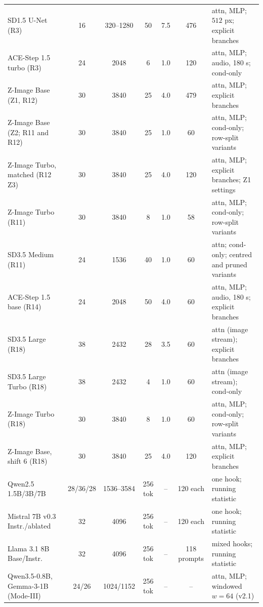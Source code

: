 \documentclass[11pt]{article}
\begin{document}
\begin{table}[!t]
\begin{tabularx}{\linewidth}{@{}>{\raggedright\arraybackslash}p{3.5cm}@{\hspace{4pt}}ccc@{\hspace{4pt}}c@{\hspace{4pt}}c@{\hspace{4pt}}L@{}}
SD1.5 U-Net (R3) & 16 & 320--1280 & 50 & 7.5 & 476 & attn, MLP; $512$ px; explicit branches\\
ACE-Step 1.5 turbo (R3) & 24 & 2048 & 6 & 1.0 & 120 & attn, MLP; audio, 180 s; cond-only\\
\midrule
Z-Image Base (Z1, R12) & 30 & 3840 & 25 & 4.0 & 479 & attn, MLP; explicit branches\\
Z-Image Base (Z2; R11 and R12) & 30 & 3840 & 25 & 1.0 & 60 & attn, MLP; cond-only; row-split variants\\
Z-Image Turbo, matched (R12 Z3) & 30 & 3840 & 25 & 4.0 & 120 & attn, MLP; explicit branches; Z1 settings\\
Z-Image Turbo (R11) & 30 & 3840 & 8 & 1.0 & 58 & attn, MLP; cond-only; row-split variants\\
SD3.5 Medium (R11) & 24 & 1536 & 40 & 1.0 & 60 & attn; cond-only; centred and pruned variants\\
ACE-Step 1.5 base (R14) & 24 & 2048 & 50 & 4.0 & 60 & attn, MLP; audio, 180 s; explicit branches\\
SD3.5 Large (R18) & 38 & 2432 & 28 & 3.5 & 60 & attn (image stream); explicit branches\\
SD3.5 Large Turbo (R18) & 38 & 2432 & 4 & 1.0 & 60 & attn (image stream); cond-only\\
Z-Image Turbo (R18) & 30 & 3840 & 8 & 1.0 & 60 & attn, MLP; cond-only; row-split variants\\
Z-Image Base, shift 6 (R18) & 30 & 3840 & 25 & 4.0 & 120 & attn, MLP; explicit branches\\
\midrule
Qwen2.5 1.5B/3B/7B & 28/36/28 & 1536--3584 & 256 tok & -- & 120 each & one hook; running statistic\\
Mistral 7B v0.3 Instr./ablated & 32 & 4096 & 256 tok & -- & 120 each & one hook; running statistic\\
Llama 3.1 8B Base/Instr. & 32 & 4096 & 256 tok & -- & 118 prompts & mixed hooks; running statistic\\
Qwen3.5-0.8B, Gemma-3-1B (Mode-III) & 24/26 & 1024/1152 & 256 tok & -- & -- & attn, MLP; windowed $w=64$ (v2.1)\\
\bottomrule
\end{tabularx}
\end{table}
\end{document}
